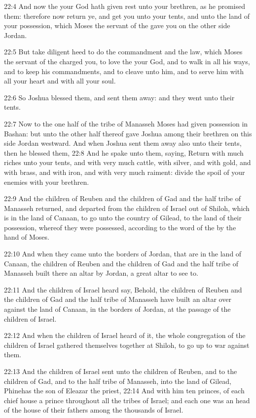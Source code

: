 22:4 And now the \LORD your God hath given rest unto your brethren, as
he promised them: therefore now return ye, and get you unto your
tents, and unto the land of your possession, which Moses the servant
of the \LORD gave you on the other side Jordan.

22:5 But take diligent heed to do the commandment and the law, which
Moses the servant of the \LORD charged you, to love the \LORD your God,
and to walk in all his ways, and to keep his commandments, and to
cleave unto him, and to serve him with all your heart and with all
your soul.

22:6 So Joshua blessed them, and sent them away: and they went unto
their tents.

22:7 Now to the one half of the tribe of Manasseh Moses had given
possession in Bashan: but unto the other half thereof gave Joshua
among their brethren on this side Jordan westward. And when Joshua
sent them away also unto their tents, then he blessed them, 22:8 And
he spake unto them, saying, Return with much riches unto your tents,
and with very much cattle, with silver, and with gold, and with brass,
and with iron, and with very much raiment: divide the spoil of your
enemies with your brethren.

22:9 And the children of Reuben and the children of Gad and the half
tribe of Manasseh returned, and departed from the children of Israel
out of Shiloh, which is in the land of Canaan, to go unto the country
of Gilead, to the land of their possession, whereof they were
possessed, according to the word of the \LORD by the hand of Moses.

22:10 And when they came unto the borders of Jordan, that are in the
land of Canaan, the children of Reuben and the children of Gad and the
half tribe of Manasseh built there an altar by Jordan, a great altar
to see to.

22:11 And the children of Israel heard say, Behold, the children of
Reuben and the children of Gad and the half tribe of Manasseh have
built an altar over against the land of Canaan, in the borders of
Jordan, at the passage of the children of Israel.

22:12 And when the children of Israel heard of it, the whole
congregation of the children of Israel gathered themselves together at
Shiloh, to go up to war against them.

22:13 And the children of Israel sent unto the children of Reuben, and
to the children of Gad, and to the half tribe of Manasseh, into the
land of Gilead, Phinehas the son of Eleazar the priest, 22:14 And with
him ten princes, of each chief house a prince throughout all the
tribes of Israel; and each one was an head of the house of their
fathers among the thousands of Israel.

